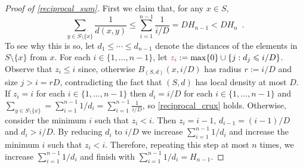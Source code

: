 \documentclass{patmorin}
\makeatletter
\renewcommand{\le}{\leqslant}
\def\mathcolor#1#{\@mathcolor{#1}}
\def\@mathcolor#1#2#3{%
  \protect\leavevmode
  \begingroup
    \color#1{#2}#3%
  \endgroup
}
\newcommand{\mathdefin}[1]{\mathcolor{brightmaroon}{#1}}
\makeatother
\begin{document}
\begin{proof}[Proof of \cref{reciprocal_sum}]
  First we claim that, for any $x\in S$,
  \begin{equation}
    \sum_{y\in S\setminus\{x\}} \frac{1}{d(x,y)} \le \sum_{i=1}^{n-1}\frac{1}{i/D} = DH_{n-1} < DH_n \enspace . \label{reciprocal_crux}
  \end{equation}
  To see why this is so, let $d_1\le\cdots\le d_{n-1}$ denote the distances of the elements in $S\setminus\{x\}$ from $x$.  For each $i\in\{1,\ldots,n-1\}$, let $\mathdefin{z_i}:=\max\{0\}\cup\{j: d_j \le i/D\}$. Observe that $z_i \le i$ since, otherwise $B_{(S,d)}(x,i/D)$ has radius $r:=i/D$ and size $j>i=rD$, contradicting the fact that $(S,d)$ has local density at most $D$.  If $z_i=i$ for each $i\in\{1,\ldots,n-1\}$ then $d_i=i/D$ for each $i\in\{1,\ldots,n-1\}$ and $\sum_{y\in S\setminus\{x\}}=\sum_{i=1}^{n-1}1/d_i=\sum_{i=1}^{n-1}\frac{1}{i/D}$, so \eqref{reciprocal_crux} holds.  Otherwise, consider the minimum $i$ such that $z_i < i$.  Then $z_i=i-1$, $d_{i-1}=(i-1)/D$ and $d_i > i/D$. By reducing $d_i$ to $i/D$ we increase $\sum_{i=1}^{n-1} 1/d_i$ and increase the minimum $i$ such that $z_i < i$. Therefore, repeating this step at most $n$ times, we increase $\sum_{i=1}^{n-1} 1/d_i$ and finish with $\sum_{i=1}^{n-1} 1/d_i= H_{n-1}$.


\end{proof}
\end{document}
